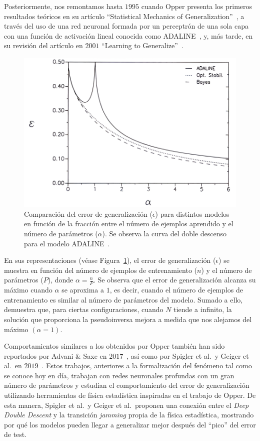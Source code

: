 Posteriormente, nos remontamos hasta $1995$ cuando Opper presenta los primeros resultados teóricos en su artículo ``Statistical Mechanics of Generalization''~\cite{Opper1995}, a través del uso de una red neuronal formada por un perceptrón de una sola capa con una función de activación lineal conocida como ADALINE~\cite{WidrowHoff1988}, y, más tarde, en su revisión del artículo en $2001$ ``Learning to Generalize''~\cite{Opper2001}.

\begin{figure}[h]
    \centering
    \includegraphics[width=0.8\linewidth]{img/estadoarte2.png}
    \caption[\textit{Deep Double Descent} presente en ADALINE.]{Comparación del error de generalización ($\epsilon$) para distintos modelos en función de la fracción entre el número de ejemplos aprendido y el número de parámetros ($\alpha$). Se observa la curva del doble descenso para el modelo ADALINE~\cite{Opper1995}.}\label{fig:estadoarte2}
\end{figure}

En sus representaciones (véase Figura~\ref{fig:estadoarte2}), el error de generalización ($\epsilon$) se muestra en función del número de ejemplos de entrenamiento ($n$) y el número de parámetros ($P$), donde $\alpha = \frac{n}{P}$. Se observa que el error de generalización alcanza su máximo cuando $\alpha$ se aproxima a $1$, es decir, cuando el número de ejemplos de entrenamiento es similar al número de parámetros del modelo. Sumado a ello, demuestra que, para ciertas configuraciones, cuando $N$ tiende a infinito, la solución que proporciona la pseudoinversa mejora a medida que nos alejamos del máximo $(\alpha = 1)$. 

Comportamientos similares a los obtenidos por Opper también han sido reportados por Advani \& Saxe en $2017$~\cite{Advani2017}, así como por Spigler et al.\ y Geiger et al.\ en $2019$~\cite{Spigler2019, Geiger2019}. Estos trabajos, anteriores a la formalización del fenómeno tal como se conoce hoy en día, trabajan con redes neuronales profundas con un gran número de parámetros y estudian el comportamiento del error de generalización utilizando herramientas de física estadística inspiradas en el trabajo de Opper. De esta manera, Spigler et al.\ y Geiger et al.\ proponen una conexión entre el \textit{Deep Double Descent} y la transición \textit{jamming} propia de la física estadística, mostrando por qué los modelos pueden llegar a generalizar mejor después del ``pico'' del error de test.

